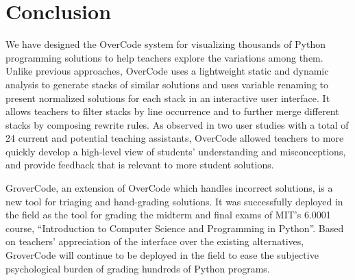 
\section{Conclusion}
We have designed the OverCode system for visualizing thousands of Python programming solutions to help teachers explore the variations among them. Unlike previous approaches, OverCode uses a lightweight static and dynamic analysis to generate stacks of similar solutions and uses variable renaming to present normalized solutions for each stack in an interactive user interface. It allows teachers to filter stacks by line occurrence and to further merge different stacks by composing rewrite rules. As observed in two user studies with a total of 24 current and potential teaching assistants, OverCode allowed teachers to more quickly develop a high-level view of students' understanding and misconceptions, and provide feedback that is relevant to more student solutions. 

GroverCode, an extension of OverCode which handles incorrect solutions, is a new tool for triaging and hand-grading solutions. It was successfully deployed in the field as the tool for grading the midterm and final exams of MIT's 6.0001 course, ``Introduction to Computer Science and Programming in Python''. Based on teachers' appreciation of the interface over the existing alternatives, GroverCode will continue to be deployed in the field to ease the subjective psychological burden of grading hundreds of Python programs. %
